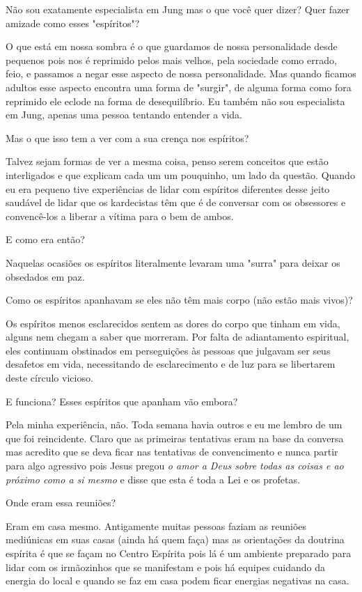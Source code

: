 \emdash{}Não sou exatamente especialista em Jung mas o que você quer dizer? Quer fazer amizade como esses "espíritos"?
 
\emdash{} O que está em nossa sombra é o que guardamos de nossa personalidade desde pequenos pois nos é reprimido pelos mais velhos, pela sociedade como errado, feio, e passamos a negar esse aspecto de nossa personalidade. Mas quando ficamos adultos esse aspecto encontra uma forma de "surgir", de alguma forma como fora reprimido ele eclode na forma de desequilíbrio. Eu também não sou especialista em Jung, apenas uma pessoa tentando entender a vida.

\emdash{}Mas o que isso tem a ver com a sua crença nos espíritos?

\emdash{}Talvez sejam formas de ver a mesma coisa, penso serem conceitos que estão interligados e que explicam cada um um pouquinho, um lado da questão. Quando eu era pequeno tive experiências de lidar com espíritos diferentes desse jeito saudável de lidar que os kardecistas têm que é de conversar com os obsessores e convencê-los a liberar a vítima para o bem de ambos.

\emdash{}E como era então?

\emdash{}Naquelas ocasiões os espíritos literalmente levaram uma "surra" para deixar os obsedados em paz.

\emdash{}Como os espíritos apanhavam se eles não têm mais corpo (não estão mais vivos)?

\emdash{}Os espíritos menos esclarecidos sentem as dores do corpo que tinham em vida, alguns nem chegam a saber que morreram. Por falta de adiantamento espiritual, eles continuam obstinados em perseguições às pessoas que julgavam ser seus desafetos em vida, necessitando de esclarecimento e de luz para se libertarem deste círculo vicioso.

\emdash{}E funciona? Esses espíritos que apanham vão embora?

\emdash{}Pela minha experiência, não. Toda semana havia outros e eu me lembro de um que foi reincidente. Claro que as primeiras tentativas eram na base da conversa mas acredito que se deva ficar nas tentativas de convencimento e nunca partir para algo agressivo pois Jesus pregou \textit{o amor a Deus sobre todas as coisas e ao próximo como a si mesmo} e disse que esta é toda a Lei e os profetas.

\emdash{}Onde eram essa reuniões?

\emdash{}Eram em casa mesmo. Antigamente muitas pessoas faziam as reuniões mediúnicas em suas casas (ainda há quem faça) mas as orientações da doutrina espírita é que se façam no Centro Espírita pois lá é um ambiente preparado para lidar com os irmãozinhos que se manifestam e pois há equipes cuidando da energia do local e quando se faz em casa podem ficar energias negativas na casa.

